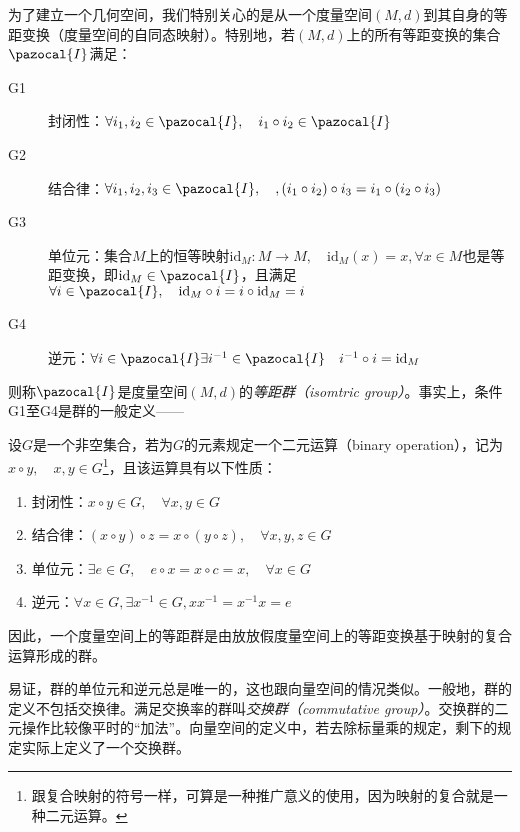 \documentclass[main.tex]{subfiles}
\begin{document}
为了建立一个几何空间，我们特别关心的是从一个度量空间$\left(M,d\right)$到其自身的等距变换（度量空间的自同态映射）。特别地，若$\left(M,d\right)$上的所有等距变换的集合$\pazocal{I}$满足：
\begin{description}
    \item[G1] 封闭性：$\forall i_1,i_2\in\pazocal{I},\quad i_1\circ i_2\in\pazocal{I}$
    \item[G2] 结合律：$\forall i_1,i_2,i_3\in\pazocal{I},\quad,\left(i_1\circ i_2\right)\circ i_3=i_1\circ\left(i_2\circ i_3\right)$
    \item[G3] 单位元：集合$M$上的恒等映射$\mathrm{id}_M:M\rightarrow M,\quad\mathrm{id}_M\left(x\right)=x,\forall x\in M$也是等距变换，即$\mathrm{id}_M\in\pazocal{I}$，且满足$\forall i\in\pazocal{I},\quad\mathrm{id}_M\circ i=i\circ\mathrm{id}_M=i$
    \item[G4] 逆元：$\forall i\in\pazocal{I}\exists i^{-1}\in\pazocal{I}\quad i^{-1}\circ i=\mathrm{id}_M$
\end{description}
则称$\pazocal{I}$是度量空间$\left(M,d\right)$的\emph{等距群（isomtric group）}。事实上，条件G1至G4是群的一般定义——

\begin{definition}[群]\label{def:II.3.3}
    设$G$是一个非空集合，若为$G$的元素规定一个二元运算（binary operation），记为$x\circ y,\quad x,y\in G$\footnote{跟复合映射的符号一样，可算是一种推广意义的使用，因为映射的复合就是一种二元运算。}，且该运算具有以下性质：
    \begin{enumerate}
        \item 封闭性：$x\circ y\in G,\quad\forall x,y\in G$
        \item 结合律：$\left(x\circ y\right)\circ z=x\circ\left(y\circ z\right),\quad\forall x,y,z\in G$
        \item 单位元：$\exists e\in G,\quad e\circ x=x\circ c=x,\quad\forall x\in G$
        \item 逆元：$\forall x\in G,\exists x^{-1}\in G,xx^{-1}=x^{-1}x=e$
    \end{enumerate}
\end{definition}

因此，一个度量空间上的等距群是由放放假度量空间上的等距变换基于映射的复合运算形成的群。

易证，群的单位元和逆元总是唯一的，这也跟向量空间的情况类似。一般地，群的定义不包括交换律。满足交换率的群叫\emph{交换群（commutative group）}。交换群的二元操作比较像平时的“加法”。向量空间的定义中，若去除标量乘的规定，剩下的规定实际上定义了一个交换群。
\end{document}
